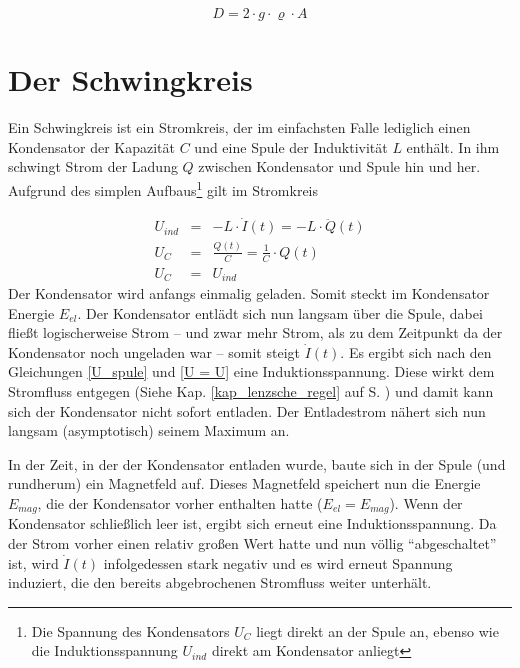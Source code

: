 	\begin{equation}
		D = 2 \cdot g \cdot \varrho \cdot A
			\label{richtgroesse_wasserpendel}
	\end{equation}




		\section{Der Schwingkreis}


Ein Schwingkreis ist ein Stromkreis, der im einfachsten Falle lediglich einen Kondensator der Kapazität \(C\) und eine Spule der Induktivität \(L\) enthält. In ihm schwingt Strom der Ladung \(Q\) zwischen Kondensator und Spule hin und her. Aufgrund des simplen Aufbaus\footnote{Die Spannung des Kondensators \(U_C\) liegt direkt an der Spule an, ebenso wie die Induktionsspannung \(U_{ind}\) direkt am Kondensator anliegt} gilt im Stromkreis

	\begin{eqnarray}
		U_{ind} &=& - L \cdot \dot{I}(t) = - L \cdot \ddot{Q}(t)
			\label{U_spule} \\
		U_C &=& \frac{Q(t)}{C} = \frac{1}{C} \cdot Q(t)
			\label{U_kondensator} \\
		U_C &=& U_{ind} 
			\label{U = U}
	\end{eqnarray}
Der Kondensator wird anfangs einmalig geladen. Somit steckt im Kondensator
Energie \(E_{el}\). Der Kondensator entlädt sich nun langsam über die Spule,
dabei fließt logischerweise Strom -- und zwar mehr Strom, als zu dem Zeitpunkt
da der Kondensator noch ungeladen war -- somit steigt \(\dot{I}(t)\). Es ergibt
sich nach den Gleichungen \ref{U_spule} und \ref{U = U} eine
Induktionsspannung. Diese wirkt
dem Stromfluss entgegen (Siehe Kap. \ref{kap_lenzsche_regel} auf S.
\pageref{kap_lenzsche_regel}) und damit kann sich der Kondensator nicht sofort
entladen. Der Entladestrom nähert sich nun langsam (asymptotisch) seinem Maximum
an. 

In der Zeit, in der der Kondensator entladen wurde, baute sich in der Spule (und rundherum) ein Magnetfeld auf. Dieses Magnetfeld speichert nun die Energie \(E_{mag}\), die der Kondensator vorher enthalten hatte (\(E_{el} = E_{mag}\)). Wenn der Kondensator schließlich leer ist, ergibt sich erneut eine Induktionsspannung. Da der Strom vorher einen relativ großen Wert hatte und nun völlig "`abgeschaltet"' ist, wird \(\dot{I}(t)\) infolgedessen stark negativ und es wird erneut Spannung induziert, die den bereits abgebrochenen Stromfluss weiter unterhält.

